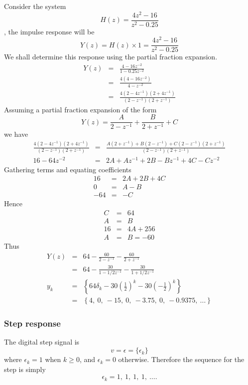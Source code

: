 Consider the system \[ H(z) = \frac{4z^2 - 16}{z^2 - 0.25}\], the
impulse response will be
\[ Y(z) = H(z)\times 1 = \frac{4z^2 - 16}{z^2 - 0.25}\]
We shall determine this response using the partial fraction
expansion.
\begin{eqnarray*}
Y(z) &=& \frac{4 - 16z^{-2}}{1 - 0.25 z^{-2}}\\
     &=& \frac{4(4 - 16z^{-2})}{4 - z^{-2}}\\
     &=& \frac{4(2 - 4z^{-1})(2 + 4z^{-1})}{(2 - z^{-1})(2 + z^{-1})}
\end{eqnarray*}
Assuming a partial fraction expansion of the form \[Y(z) =
\frac{A}{2 - z^{-1}} + \frac{B}{2 + z^{-1}} + C \]  we have
\begin{eqnarray*}
 \frac{4(2 - 4z^{-1})(2 + 4z^{-1})}{(2 - z^{-1})(2 + z^{-1})}
     &=& \frac{A(2 + z^{-1}) + B(2 - z^{-1}) + C(2 - z^{-1})(2 + z^{-1})}{(2 - z^{-1})(2 + z^{-1})}\\
     16 - 64z^{-2} &=& 2A + Az^{-1} + 2B - Bz^{-1} + 4C - Cz^{-2}
 \end{eqnarray*}
Gathering terms and equating coefficients
\begin{eqnarray}
16 &=& 2A +2B + 4C\\ 0 &=& A - B\\ -64 &=& -C
\end{eqnarray}
Hence
\begin{eqnarray}
C &=& 64\\ A &=& B\\ 16 &=& 4A + 256\\ A &=& B = -60
\end{eqnarray}
Thus
\begin{eqnarray*}
    Y(z) &=& 64 -\frac{60}{2-z^{-1}}-\frac{60}{2+z^{-1}}\\
    &=& 64 -\frac{30}{1-1/2 z^{-1}}-\frac{30}{1+1/2 z^{-1}}\\
     y_k& =& \left\{64\delta_k - 30\left(\frac{1}{2}\right)^k - 30
\left(-\frac{1}{2}\right)^k\right\}\\
 &=& \left\{4,\ 0,\ -15,\ 0,\ -3.75,\ 0,\ -0.9375,\ \ldots
 \right\}
\end{eqnarray*}

\subsubsection*{Step response}
The digital step signal is
\begin{equation}\label{eq:l10e5}
  v = \epsilon = \{\epsilon_k\}
\end{equation}
where $\epsilon_k = 1$ when $k \ge 0$, and $\epsilon_k = 0$
otherwise. Therefore the sequence for the step is simply
\[\epsilon_k = 1,\ 1,\ 1,\ 1,\ \ldots.\]


